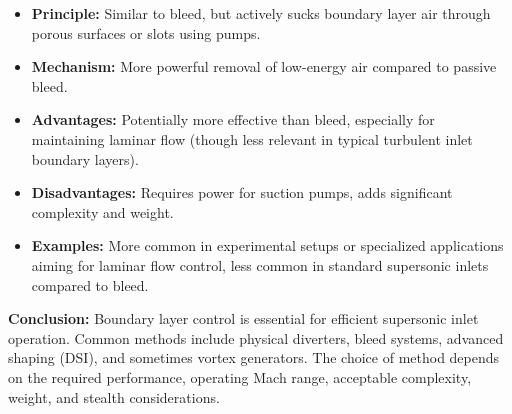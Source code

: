 \begin{enumerate}
  \begin{itemize}
  \tightlist
  \item
    \textbf{Principle:} Similar to bleed, but actively sucks boundary
    layer air through porous surfaces or slots using pumps.
  \item
    \textbf{Mechanism:} More powerful removal of low-energy air compared
    to passive bleed.
  \item
    \textbf{Advantages:} Potentially more effective than bleed,
    especially for maintaining laminar flow (though less relevant in
    typical turbulent inlet boundary layers).
  \item
    \textbf{Disadvantages:} Requires power for suction pumps, adds
    significant complexity and weight.
  \item
    \textbf{Examples:} More common in experimental setups or specialized
    applications aiming for laminar flow control, less common in
    standard supersonic inlets compared to bleed.
  \end{itemize}
\end{enumerate}

\textbf{Conclusion:} Boundary layer control is essential for efficient
supersonic inlet operation. Common methods include physical diverters,
bleed systems, advanced shaping (DSI), and sometimes vortex generators.
The choice of method depends on the required performance, operating Mach
range, acceptable complexity, weight, and stealth considerations.

